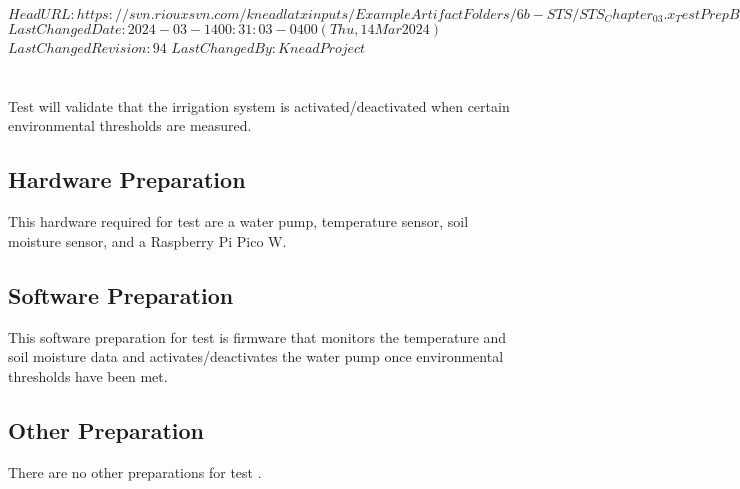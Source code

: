 \svnidlong
{$HeadURL: https://svn.riouxsvn.com/kneadlatxinputs/ExampleArtifactFolders/6b-STS/STS_Chapter_03.x_TestPrepBase.tex $}
{$LastChangedDate: 2024-03-14 00:31:03 -0400 (Thu, 14 Mar 2024) $}
{$LastChangedRevision: 94 $}
{$LastChangedBy: KneadProject $}

\section{\StsTestID}
\label{loc:Prep\StsTestID}
% 

Test  will validate that the irrigation system is activated/deactivated when certain environmental thresholds are measured.

\subsection{Hardware Preparation}
\label{loc:HardwarePrep\StsTestID}
% 

This hardware required for test  are a water pump, temperature sensor, soil moisture sensor, and a Raspberry Pi Pico W.

\subsection{Software Preparation}
\label{loc:SoftwarePrep\StsTestID}
% 

This software preparation for test  is firmware
that monitors the temperature and soil moisture data and activates/deactivates the water pump once environmental thresholds have been met.

\subsection{Other Preparation}
\label{loc:OtherPrep\StsTestID}
% 

There are no other preparations for test .
